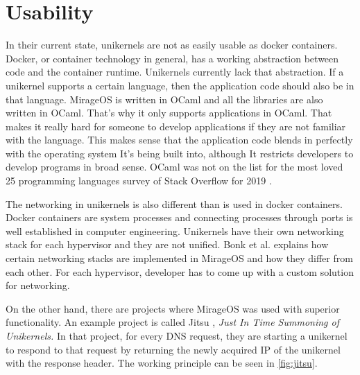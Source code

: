 \section{Usability}
In their current state, unikernels are not as easily usable as docker containers. Docker, or container technology in general, has a working abstraction between code and the container runtime. Unikernels currently lack that abstraction. If a unikernel supports a certain language, then the application code should also be in that language. MirageOS is written in OCaml and all the libraries are also written in OCaml. That's why it only supports applications in OCaml. That makes it really hard for someone to develop applications if they are not familiar with the language. This makes sense that the application code blends in perfectly with the operating system It's being built into, although It restricts developers to develop programs in broad sense. OCaml was not on the list for the most loved 25 programming languages survey of Stack Overflow for 2019 \cite{2019-survey}.

The networking in unikernels is also different than is used in docker containers. Docker containers are system processes and connecting processes through ports is well established in computer engineering. Unikernels have their own networking stack for each hypervisor and they are not unified. Bonk et al. \cite{Bonk} explains how certain networking stacks are implemented in MirageOS and how they differ from each other. For each hypervisor, developer has to come up with a custom solution for networking.

On the other hand, there are projects where MirageOS was used with superior functionality. An example project is called Jitsu \cite{jitsu}, \textit{Just In Time Summoning of Unikernels.} In that project, for every DNS request, they are starting a unikernel to respond to that request by returning the newly acquired IP of the unikernel with the response header. The working principle can be seen in \ref{fig:jitsu}.

